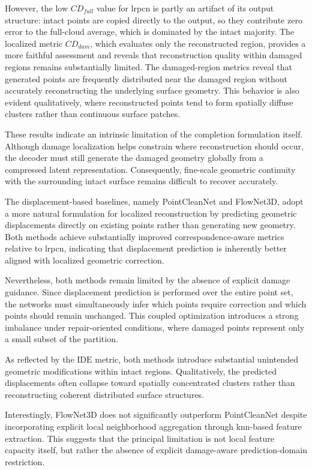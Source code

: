 However, the low ${CD}_{full}$ value for \ac{lrpcn} is partly an artifact of its output structure: intact points are copied directly to the output, so they contribute zero error to the full-cloud average, which is dominated by the intact majority. The localized metric ${CD}_{dam}$, which evaluates only the reconstructed region, provides a more faithful assessment and reveals that reconstruction quality within damaged regions remains substantially limited. The damaged-region metrics reveal that generated points are frequently distributed near the damaged region without accurately reconstructing the underlying surface geometry. This behavior is also evident qualitatively, where reconstructed points tend to form spatially diffuse clusters rather than continuous surface patches.

These results indicate an intrinsic limitation of the completion formulation itself. Although damage localization helps constrain where reconstruction should occur, the decoder must still generate the damaged geometry globally from a compressed latent representation. Consequently, fine-scale geometric continuity with the surrounding intact surface remains difficult to recover accurately.

The displacement-based baselines, namely PointCleanNet and FlowNet3D, adopt a more natural formulation for localized reconstruction by predicting geometric displacements directly on existing points rather than generating new geometry. Both methods achieve substantially improved correspondence-aware metrics relative to \ac{lrpcn}, indicating that displacement prediction is inherently better aligned with localized geometric correction.

Nevertheless, both methods remain limited by the absence of explicit damage guidance. Since displacement prediction is performed over the entire point set, the networks must simultaneously infer which points require correction and which points should remain unchanged. This coupled optimization introduces a strong imbalance under repair-oriented conditions, where damaged points represent only a small subset of the partition.

As reflected by the $\mathrm{IDE}$ metric, both methods introduce substantial unintended geometric modifications within intact regions. Qualitatively, the predicted displacements often collapse toward spatially concentrated clusters rather than reconstructing coherent distributed surface structures.

Interestingly, FlowNet3D does not significantly outperform PointCleanNet despite incorporating explicit local neighborhood aggregation through \ac{knn}-based feature extraction. This suggests that the principal limitation is not local feature capacity itself, but rather the absence of explicit damage-aware prediction-domain restriction.


